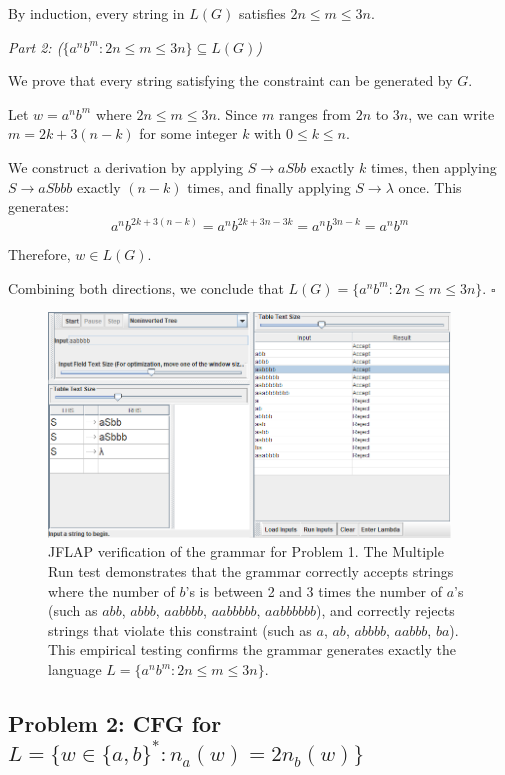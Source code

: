 \documentclass[12pt]{article}
\begin{document}
By induction, every string in $L(G)$ satisfies $2n \le m \le 3n$.

\textit{Part 2: ($\{a^n b^m : 2n \le m \le 3n\} \subseteq L(G)$)}

We prove that every string satisfying the constraint can be generated by $G$.

Let $w = a^n b^m$ where $2n \le m \le 3n$. Since $m$ ranges from $2n$ to $3n$, we can write $m = 2k + 3(n-k)$ for some integer $k$ with $0 \le k \le n$.

We construct a derivation by applying $S \rightarrow aSbb$ exactly $k$ times, then applying $S \rightarrow aSbbb$ exactly $(n-k)$ times, and finally applying $S \rightarrow \lambda$ once. This generates:
$$a^n b^{2k + 3(n-k)} = a^n b^{2k + 3n - 3k} = a^n b^{3n - k} = a^n b^m$$

Therefore, $w \in L(G)$.

Combining both directions, we conclude that $L(G) = \{a^n b^m : 2n \le m \le 3n\}$. $\square$

\begin{figure}[H]
\centering
\includegraphics[width=0.95\textwidth]{Problem 1/Problem 1.png}
\caption{JFLAP verification of the grammar for Problem 1. The Multiple Run test demonstrates that the grammar correctly accepts strings where the number of $b$'s is between 2 and 3 times the number of $a$'s (such as $abb$, $abbb$, $aabbbb$, $aabbbbb$, $aabbbbbb$), and correctly rejects strings that violate this constraint (such as $a$, $ab$, $abbbb$, $aabbb$, $ba$). This empirical testing confirms the grammar generates exactly the language $L = \{a^n b^m : 2n \le m \le 3n\}$.}
\label{fig:problem1}
\end{figure}

\newpage

\subsection{Problem 2: CFG for $L = \{w \in \{a,b\}^* : n_a(w) = 2n_b(w)\}$}
\end{document}
